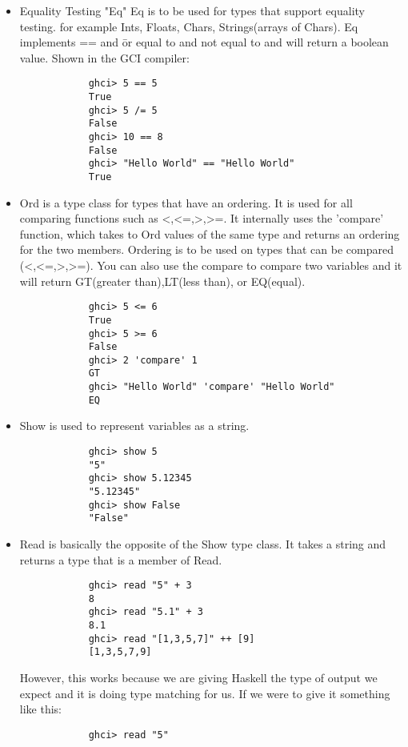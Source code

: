 \documentclass{article}
\begin{document}
\begin{itemize}
\begin{itemize}
      \begin{itemize}
          \item Equality Testing "Eq"
          Eq is to be used for types that support equality testing. for example Ints, Floats, Chars, Strings(arrays of Chars). Eq implements == and \= or equal to and not equal to and will return a boolean value. Shown in the GCI compiler:
          \begin{lstlisting}
            ghci> 5 == 5
            True
            ghci> 5 /= 5
            False
            ghci> 10 == 8
            False
            ghci> "Hello World" == "Hello World"
            True
          \end{lstlisting}
         \item Ord is a type class for types that have an ordering. It is used for all comparing functions such as <,<=,>,>=. It internally uses the 'compare' function, which takes to Ord values of the same type and returns an ordering for the two members. Ordering is to be used on types that can be compared (<,<=,>,>=). You can also use the compare to compare two variables and it will return GT(greater than),LT(less than), or EQ(equal).
        \begin{lstlisting}
            ghci> 5 <= 6
            True
            ghci> 5 >= 6
            False
            ghci> 2 'compare' 1
            GT
            ghci> "Hello World" 'compare' "Hello World"
            EQ
          \end{lstlisting}
        \item Show is used to represent variables as a string.
        \begin{lstlisting}
            ghci> show 5
            "5"
            ghci> show 5.12345
            "5.12345"
            ghci> show False
            "False"

          \end{lstlisting}
        \item Read is basically the opposite of the Show type class. It takes a string and returns a type that is a member of Read.
        \begin{lstlisting}
            ghci> read "5" + 3
            8
            ghci> read "5.1" + 3
            8.1
            ghci> read "[1,3,5,7]" ++ [9]
            [1,3,5,7,9]
          \end{lstlisting}
          However, this works because we are giving Haskell the type of output we expect and it is doing type matching for us. If we were to give it something like this:
       \begin{lstlisting}
            ghci> read "5"


\end{lstlisting}
\end{itemize}
\end{itemize}
\end{itemize}
\end{document}
